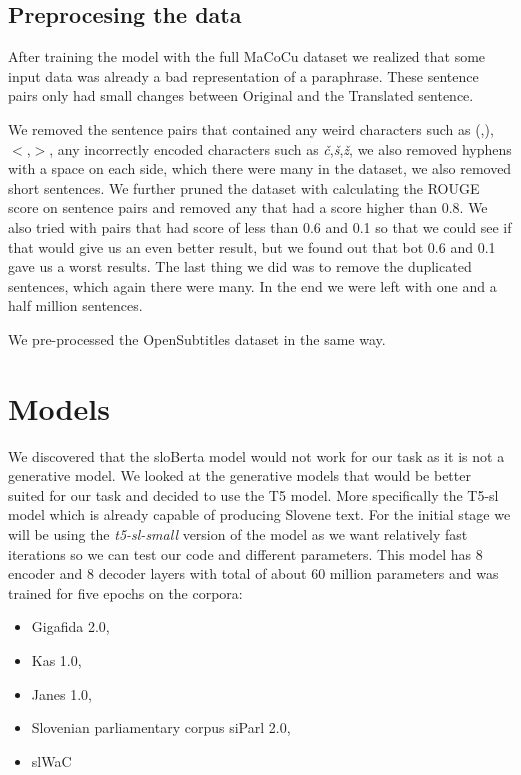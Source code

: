 \documentclass[fleqn,moreauthors,10pt]{ds_report}
\begin{document}
\subsection{Preprocesing the data}
\label{sub-sec:preprocess}
After training the model with the full MaCoCu dataset we realized that some input data was already a bad representation of a paraphrase. These sentence pairs only had small changes between Original and the Translated sentence.   

We removed the sentence pairs that contained any weird characters such as (,),$<$,$>$, any incorrectly encoded characters such as \emph{č},\emph{š},\emph{ž}, we also removed hyphens with a space on each side, which there were many in the dataset, we also removed short sentences. We further pruned the dataset with calculating the ROUGE score on sentence pairs and removed any that had a score higher than 0.8. We also tried with pairs that had score of less than 0.6 and 0.1 so that we could see if that would give us an even better result, but we found out that bot 0.6 and 0.1 gave us a worst results. The last thing we did was to remove the duplicated sentences, which again there were many. In the end we were left with one and a half million sentences.

We pre-processed the OpenSubtitles dataset in the same way.


\section{Models}

We discovered that the sloBerta model would not work for our task as it is not a generative model. We looked at the generative models that would be better suited for our task and decided to use the T5 model. More specifically the T5-sl model which is already capable of producing Slovene text. For the initial stage we will be using the \emph{t5-sl-small} version of the model as we want relatively fast iterations so we can test our code and different parameters. This model has 8 encoder and 8 decoder layers with total of about 60 million parameters and was trained for five epochs on the corpora:
\begin{itemize}[itemsep=2pt]
    \item Gigafida 2.0,
    \item Kas 1.0,
    \item Janes 1.0,
    \item Slovenian parliamentary corpus siParl 2.0,
    \item slWaC
\end{itemize}
\end{document}
